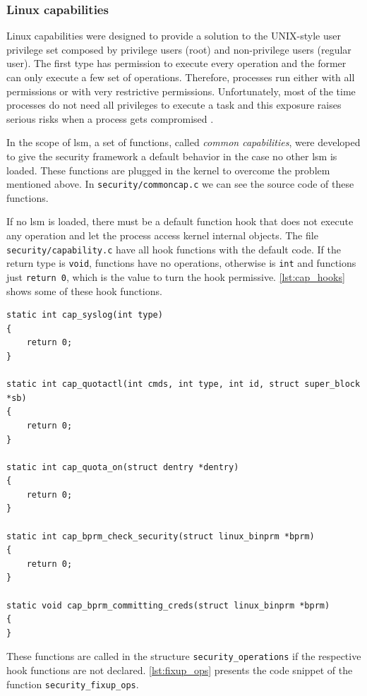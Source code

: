 \subsubsection{Linux capabilities}
\label{sec:linux_capabilities}

Linux capabilities were designed to provide a solution to the UNIX-style user privilege set composed by privilege users (root) and non-privilege users (regular user). The first type has permission to execute every operation and the former can only execute a few set of operations. Therefore, processes run either with all permissions or with very restrictive permissions. Unfortunately, most of the time processes do not need all privileges to execute a task and this exposure raises serious risks when a process gets compromised \cite{Wiki:Capabilities}.

In the scope of \gls{lsm}, a set of functions, called \textit{common capabilities}, were developed to give the security framework a default behavior in the case no other \gls{lsm} is loaded. These functions are plugged in the kernel to overcome the problem mentioned above. In \texttt{security/commoncap.c} we can see the source code of these functions.

If no \gls{lsm} is loaded, there must be a default function hook that does not execute any operation and let the process access kernel internal objects. The file \texttt{security/capability.c} have all hook functions with the default code. If the return type is \texttt{void}, functions have no operations, otherwise is \texttt{int} and functions just \texttt{return 0}, which is the value to turn the hook permissive. \autoref{lst:cap_hooks} shows some of these hook functions.

\begin{lstlisting}[style=CInputStyle, caption=Capability functions (Linux kernel v3.11), label=lst:cap_hooks]
static int cap_syslog(int type)
{
	return 0;
}

static int cap_quotactl(int cmds, int type, int id, struct super_block *sb)
{
	return 0;
}

static int cap_quota_on(struct dentry *dentry)
{
	return 0;
}

static int cap_bprm_check_security(struct linux_binprm *bprm)
{
	return 0;
}

static void cap_bprm_committing_creds(struct linux_binprm *bprm)
{
}
\end{lstlisting}

These functions are called in the structure \texttt{security\_operations} if the respective hook functions are not declared. \autoref{lst:fixup_ops} presents the code snippet of the function \texttt{security\_fixup\_ops}.


